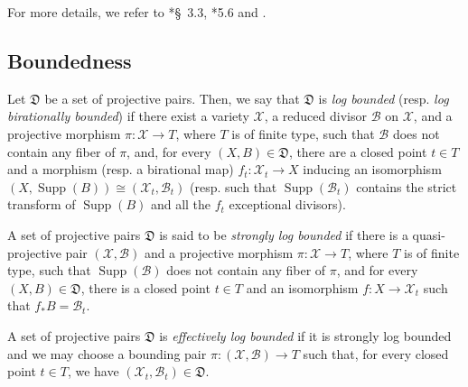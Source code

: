 \documentclass{amsart}
\theoremstyle{definition}
\DeclareMathOperator{\Supp}{Supp}
\newcommand{\rar}{\rightarrow}
\begin{document}
For more details, we refer to \cite{kol_new}*{\S~3.3}, \cite{Kol13}*{5.6} and \cite{HK04}.


\subsection{Boundedness}
Let $\mathfrak{D}$ be a set of projective pairs.
Then, we say that $\mathfrak{D}$ is {\it log bounded} (resp. {\it log birationally bounded}) if there exist a variety $\mathcal{X}$, a reduced divisor $\mathcal{B}$ on $\mathcal{X}$, and a projective morphism $\pi \colon \mathcal{X} \rar T$, where $T$ is of finite type, such that $\mathcal{B}$ does not contain any fiber of $\pi$, and, for every $(X,B) \in \mathfrak{D}$, there are a closed point $t \in T$ and a morphism (resp. a birational map) $f_t \colon \mathcal{X}_t \rar X$ inducing an isomorphism $(X,\Supp(B)) \cong (\mathcal{X}_t,\mathcal{B}_t)$ (resp. such that $\Supp(\mathcal B _t)$ contains the strict transform of $\Supp(B)$ and all the $f_t$ exceptional divisors).

A set of projective pairs $\mathfrak{D}$ is said to be {\it strongly log bounded} if there is a quasi-projective pair $(\mathcal{X},\mathcal{B})$ and a projective morphism $\pi \colon \mathcal{X} \rar T$, where $T$ is of finite type, such that $\Supp(\mathcal{B})$ does not contain any fiber of $\pi$, and for every $(X,B) \in \mathfrak D$, there is a closed point $t \in T$ and an isomorphism $f \colon X \rar \mathcal{X}_t$ such that $f_*B=\mathcal{B}_t$.

A set of projective pairs $\mathfrak{D}$ is {\it effectively log bounded} if it is strongly log bounded and we may choose a bounding pair $\pi \colon (\mathcal{X},\mathcal{B}) \rar T$ such that, for every closed point $t \in T$, we have $(\mathcal{X}_t,\mathcal{B}_t) \in \mathfrak D$.
\end{document}
